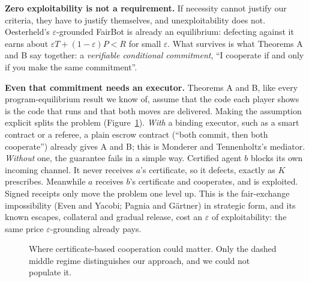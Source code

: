 \documentclass[11pt]{article}
\begin{document}
\textbf{Zero exploitability is not a requirement.} If necessity cannot justify our criteria, they have to justify themselves, and unexploitability does not. Oesterheld's $\varepsilon$-grounded FairBot is already an equilibrium: defecting against it earns about $\varepsilon T + (1-\varepsilon)P < R$ for small $\varepsilon$. What survives is what Theorems A and B say together: a \emph{verifiable conditional commitment}, ``I cooperate if and only if you make the same commitment''.

\textbf{Even that commitment needs an executor.} Theorems A and B, like every program-equilibrium result we know of, assume that the code each player shows is the code that runs and that both moves are delivered. Making the assumption explicit splits the problem (Figure~\ref{fig:executor}). \emph{With} a binding executor, such as a smart contract or a referee, a plain escrow contract (``both commit, then both cooperate'') already gives A and B; this is Monderer and Tennenholtz's mediator. \emph{Without} one, the guarantee fails in a simple way. Certified agent $b$ blocks its own incoming channel. It never receives $a$'s certificate, so it defects, exactly as $K$ prescribes. Meanwhile $a$ receives $b$'s certificate and cooperates, and is exploited. Signed receipts only move the problem one level up. This is the fair-exchange impossibility (Even and Yacobi; Pagnia and Gärtner) in strategic form, and its known escapes, collateral and gradual release, cost an $\varepsilon$ of exploitability: the same price $\varepsilon$-grounding already pays.

\begin{figure}[t]
\centering
{}
\caption{Where certificate-based cooperation could matter. Only the dashed middle regime distinguishes our approach, and we could not populate it.}
\label{fig:executor}
\end{figure}
\end{document}
